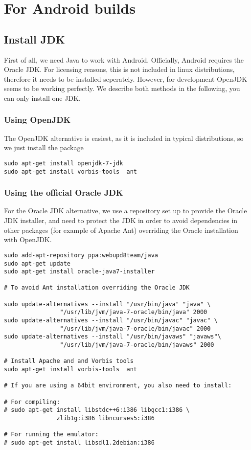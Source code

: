 \section{For Android  builds}
\subsection{Install JDK}
First of all, we need Java to work with Android. Officially, Android requires the Oracle JDK. For licensing reasons, this is not included in linux distributions, therefore it needs to be installed seperately.  However, for \xc development OpenJDK seems to be working perfectly. We describe both methods in the following, you can only install one JDK.

\subsubsection{Using OpenJDK}
The OpenJDK alternative is easiest, as it is included in typical distributions, so we just install the package
\begin{verbatim}
sudo apt-get install openjdk-7-jdk
sudo apt-get install vorbis-tools  ant
\end{verbatim}

\subsubsection{Using the official Oracle JDK}
For the Oracle JDK alternative, we use a repository set up to provide the Oracle JDK installer, and need to protect the JDK in order to avoid dependencies in other packages (for example of Apache Ant) overriding the Oracle installation with OpenJDK.

\begin{verbatim}
sudo add-apt-repository ppa:webupd8team/java
sudo apt-get update
sudo apt-get install oracle-java7-installer

# To avoid Ant installation overriding the Oracle JDK

sudo update-alternatives --install "/usr/bin/java" "java" \
                "/usr/lib/jvm/java-7-oracle/bin/java" 2000
sudo update-alternatives --install "/usr/bin/javac" "javac" \
                "/usr/lib/jvm/java-7-oracle/bin/javac" 2000
sudo update-alternatives --install "/usr/bin/javaws" "javaws"\
                "/usr/lib/jvm/java-7-oracle/bin/javaws" 2000

# Install Apache and and Vorbis tools
sudo apt-get install vorbis-tools  ant

# If you are using a 64bit environment, you also need to install:

# For compiling:
# sudo apt-get install libstdc++6:i386 libgcc1:i386 \
               zlib1g:i386 libncurses5:i386

# For running the emulator:
# sudo apt-get install libsdl1.2debian:i386
\end{verbatim}


